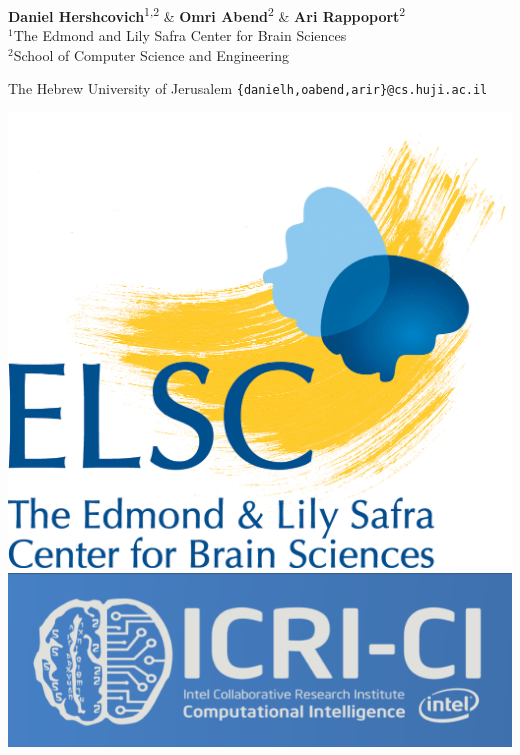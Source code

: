 \documentclass[a0,portrait]{a0poster}
\begin{document}
\hspace{1cm}
\begin{minipage}[b]{0.57\linewidth}
\LARGE \textbf{Daniel Hershcovich}\textsuperscript{1,2} \&
	   \textbf{Omri Abend}\textsuperscript{2} \&
	   \textbf{Ari Rappoport}\textsuperscript{2} \\[0.5cm]
\Large $^1$The Edmond and Lily Safra Center for Brain Sciences \\
  $^2$School of Computer Science and Engineering
  \setlength{\columnseprule}{0pt}
  \setlength\multicolsep{-20pt}
  \begin{multicols}{2}
  The Hebrew University of Jerusalem
  \large \texttt{\{danielh,oabend,arir\}@cs.huji.ac.il}
  \end{multicols}
\end{minipage}
\hfill
\begin{minipage}[b]{.09\linewidth}
\includegraphics[width=\linewidth]{elsc_logo.png}\vspace{5mm}
\includegraphics[width=\linewidth]{icrici_banner.png}
\end{minipage}
\end{document}
